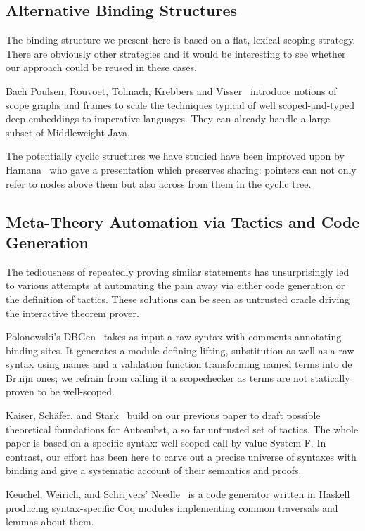 \subsection{Alternative Binding Structures} The binding structure we
present here is based on a flat, lexical scoping strategy. There are
obviously other strategies and it would be interesting to see whether
our approach could be reused in these cases.

Bach Poulsen, Rouvoet, Tolmach, Krebbers and Visser~\citeyear{BachPoulsen}
introduce notions of scope graphs and frames to scale the techniques typical
of well scoped-and-typed deep embeddings to imperative languages. They can
already handle a large subset of Middleweight Java.

The potentially cyclic structures we have studied have been improved
upon by Hamana~\citeyear{Hamana2009} who gave a presentation which
preserves sharing: pointers can not only refer to nodes above them
but also across from them in the cyclic tree.

\subsection{Meta-Theory Automation via Tactics and Code Generation} The
tediousness of repeatedly
proving similar statements has unsurprisingly led to various attempts at
automating the pain away via either code generation or the definition of
tactics. These solutions can be seen as untrusted oracle driving the
interactive theorem prover.

Polonowski's DBGen~\citeyear{polonowski:db} takes as input a raw syntax with
comments annotating binding sites. It generates a module defining lifting,
substitution as well as a raw syntax using names and a validation function
transforming named terms into de Bruijn ones; we refrain from calling it a
scopechecker as terms are not statically proven to be well-scoped.

Kaiser, Schäfer, and Stark~\citeyear{Kaiser-wsdebr} build on our previous paper
to draft possible theoretical foundations for Autosubst, a so far untrusted
set of tactics. The whole paper is based on a specific syntax: well-scoped
call by value System F. In contrast, our effort has been here to carve out
a precise universe of syntaxes with binding and give a systematic account
of their semantics and proofs.

Keuchel, Weirich, and Schrijvers' Needle~\citeyear{needleandknot} is a code
generator written in Haskell producing syntax-specific Coq modules
implementing common traversals and lemmas about them.

